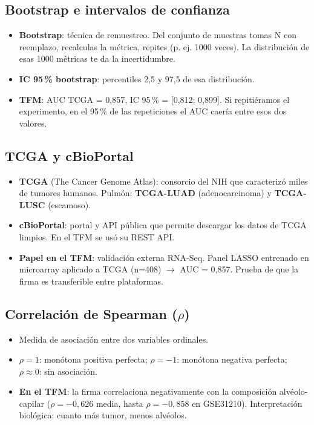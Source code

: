 \documentclass[11pt, a4paper]{article}
\begin{document}
\subsection{Bootstrap e intervalos de confianza}

\begin{itemize}[leftmargin=1.2em, itemsep=2pt]
  \item \textbf{Bootstrap}: t\'ecnica de remuestreo. Del conjunto de muestras tomas N con reemplazo, recalculas la m\'etrica, repites (p. ej. 1000 veces). La distribuci\'on de esas 1000 m\'etricas te da la incertidumbre.
  \item \textbf{IC 95\,\% bootstrap}: percentiles 2,5 y 97,5 de esa distribuci\'on.
  \item \textbf{TFM}: AUC TCGA = 0,857, IC 95\,\% = [0,812; 0,899]. Si repiti\'eramos el experimento, en el 95\,\% de las repeticiones el AUC caer\'ia entre esos dos valores.
\end{itemize}

\subsection{TCGA y cBioPortal}

\begin{itemize}[leftmargin=1.2em, itemsep=2pt]
  \item \textbf{TCGA} (The Cancer Genome Atlas): consorcio del NIH que caracteriz\'o miles de tumores humanos. Pulm\'on: \textbf{TCGA-LUAD} (adenocarcinoma) y \textbf{TCGA-LUSC} (escamoso).
  \item \textbf{cBioPortal}: portal y API p\'ublica que permite descargar los datos de TCGA limpios. En el TFM se us\'o su REST API.
  \item \textbf{Papel en el TFM}: validaci\'on externa RNA-Seq. Panel LASSO entrenado en microarray aplicado a TCGA (n=408) $\to$ AUC = 0,857. Prueba de que la firma es transferible entre plataformas.
\end{itemize}

\subsection{Correlaci\'on de Spearman ($\rho$)}

\begin{itemize}[leftmargin=1.2em, itemsep=2pt]
  \item Medida de asociaci\'on entre dos variables ordinales.
  \item $\rho = 1$: mon\'otona positiva perfecta; $\rho = -1$: mon\'otona negativa perfecta; $\rho \approx 0$: sin asociaci\'on.
  \item \textbf{En el TFM}: la firma correlaciona negativamente con la composici\'on alv\'eolo-capilar ($\rho = -0{,}626$ media, hasta $\rho = -0{,}858$ en GSE31210). Interpretaci\'on biol\'ogica: cuanto m\'as tumor, menos alv\'eolos.
\end{itemize}
\end{document}
